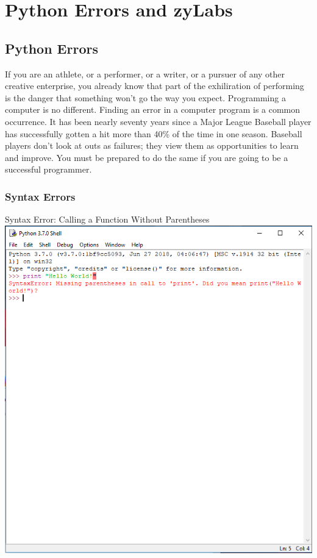 
\chapter{Python Errors and zyLabs}


\minitoc

\section{Python Errors}
\label{sec:errors}

If you are an athlete, or a performer, or a writer, or a pursuer of any other creative enterprise, you already know that part of the exhiliration of performing is the danger that something won't go the way you expect.  Programming a computer is no different.  Finding an error in a computer program is a common occurrence.  It has been nearly seventy years since a Major League Baseball player has successfully gotten a hit more than 40\% of the time in one season.  Baseball players don't look at outs as failures; they view them as opportunities to learn and improve.  You must be prepared to do the same if you are going to be a successful programmer.

\subsection{Syntax Errors}

\begin{myfigure}[float,label=fig:syntax-error]{Syntax Error: Calling a Function Without Parentheses}
    \centering
    \includegraphics[scale=0.825]{screenshots/syntax-error}
\end{myfigure}

